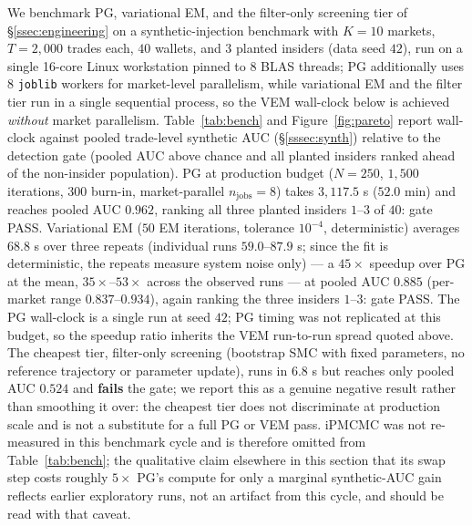 We benchmark PG, variational EM, and the filter-only screening tier of \S\ref{ssec:engineering} on a synthetic-injection benchmark with $K = 10$ markets, $T = 2{,}000$ trades each, $40$ wallets, and $3$ planted insiders (data seed $42$), run on a single 16-core Linux workstation pinned to $8$ BLAS threads; PG additionally uses $8$ \texttt{joblib} workers for market-level parallelism, while variational EM and the filter tier run in a single sequential process, so the VEM wall-clock below is achieved \emph{without} market parallelism. Table~\ref{tab:bench} and Figure~\ref{fig:pareto} report wall-clock against pooled trade-level synthetic AUC (\S\ref{sssec:synth}) relative to the detection gate (pooled AUC above chance and all planted insiders ranked ahead of the non-insider population). PG at production budget ($N = 250$, $1{,}500$ iterations, $300$ burn-in, market-parallel $n_{\mathrm{jobs}} = 8$) takes $3{,}117.5$ s ($52.0$ min) and reaches pooled AUC $0.962$, ranking all three planted insiders $1$--$3$ of $40$: gate PASS. Variational EM ($50$ EM iterations, tolerance $10^{-4}$, deterministic) averages $68.8$ s over three repeats (individual runs $59.0$--$87.9$ s; since the fit is deterministic, the repeats measure system noise only) --- a $45\times$ speedup over PG at the mean, $35\times$--$53\times$ across the observed runs --- at pooled AUC $0.885$ (per-market range $0.837$--$0.934$), again ranking the three insiders $1$--$3$: gate PASS. The PG wall-clock is a single run at seed $42$; PG timing was not replicated at this budget, so the speedup ratio inherits the VEM run-to-run spread quoted above. The cheapest tier, filter-only screening (bootstrap SMC with fixed parameters, no reference trajectory or parameter update), runs in $6.8$ s but reaches only pooled AUC $0.524$ and \textbf{fails} the gate; we report this as a genuine negative result rather than smoothing it over: the cheapest tier does not discriminate at production scale and is not a substitute for a full PG or VEM pass. iPMCMC was not re-measured in this benchmark cycle and is therefore omitted from Table~\ref{tab:bench}; the qualitative claim elsewhere in this section that its swap step costs roughly $5\times$ PG's compute for only a marginal synthetic-AUC gain reflects earlier exploratory runs, not an artifact from this cycle, and should be read with that caveat.

